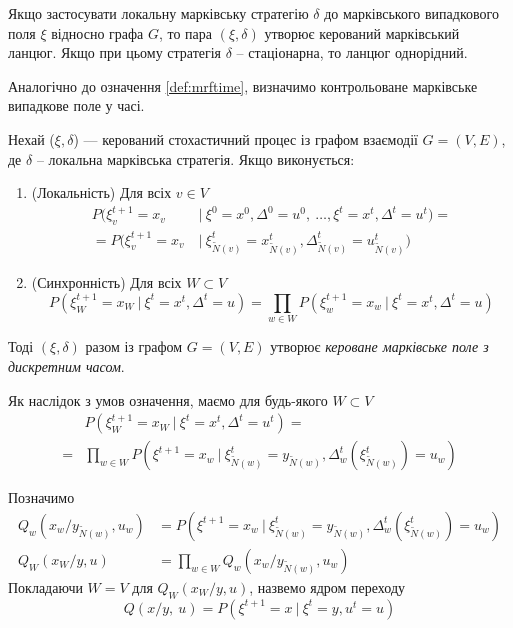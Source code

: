 \documentclass[oneside,draft,14pt]{extarticle}
\begin{document}
Якщо застосувати локальну марківську стратегію \(\delta\) до марківського випадкового поля \(\xi\) відносно графа \(G\), то пара \((\xi, \delta)\) утворює керований марківський ланцюг. Якщо при цьому стратегія \(\delta\) – стаціонарна, то ланцюг однорідний.

	Аналогічно до означення \ref{def:mrftime}, визначимо контрольоване марківське випадкове поле у часі.
	
\begin{definition}
\label{def:ctrlmrftime}
Нехай (\(\xi, \delta \)) — керований стохастичний процес із графом взаємодії \(G = (V, E)\), де \(\delta\) – локальна марківська стратегія. Якщо виконується:
\begin{enumerate}
    \item (Локальність) Для всіх \(v \in V\)
	\begin{align*}
    P(\xi_v^{t+1} = x_v\ &|\ \xi^0 = x^0, \Delta^0 = u^0,\ \ldots, \xi^t = x^t, \Delta^t = u^t) = \\
	= P(\xi_v^{t+1} = x_v\ &|\ \xi_{\tilde N(v)}^t = x_{\tilde N(v)}^t, \Delta_{\tilde N(v)}^t = u_{\tilde N(v)}^t)
	\end{align*}
	\item (Синхронність) Для всіх \(W \subset V\)
	\[P(\xi^{t+1}_W = x_W\ |\ \xi^t = x^t, \Delta^t = u) = \prod_{w \in W} P(\xi^{t+1}_w = x_w\ |\ \xi^t = x^t, \Delta^t = u) \]
\end{enumerate}
Тоді \((\xi, \delta)\) разом із графом \(G=(V,E)\) утворює \textit{кероване марківське поле з дискретним часом}.
\end{definition}

Як наслідок з умов означення, маємо для будь-якого \(W \subset V\)
\begin{align*}
&P(\xi_W^{t+1} = x_W\ |\ \xi^t = x^t, \Delta^t = u^t) = \\
= &\prod_{w \in W} P(\xi^{t+1} = x_w\ |\ \xi_{\tilde{N}(w)}^t = y_{\tilde{N}(w)}, \Delta_w^t(\xi_{\tilde{N}(w)}^t) = u_w)
\end{align*}

\begin{definition} 
Позначимо
\begin{align*}
Q_w(x_w / y_{\tilde{N}(w)}, u_w) &= P(\xi^{t+1} = x_w\ |\ \xi_{\tilde{N}(w)}^t = y_{\tilde{N}(w)}, \Delta_w^t(\xi_{\tilde{N}(w)}^t) = u_w) \\
Q_W(x_W / y, u) &= \prod_{w \in W} Q_w(x_w / y_{\tilde{N}(w)}, u_w)
\end{align*}
Покладаючи \(W = V\) для \( Q_W(x_W / y, u) \), назвемо ядром переходу
\[Q(x/y,\ u) = P(\xi^{t+1} = x\ |\ \xi^t = y, u^t = u)\]
\end{definition}
\end{document}
